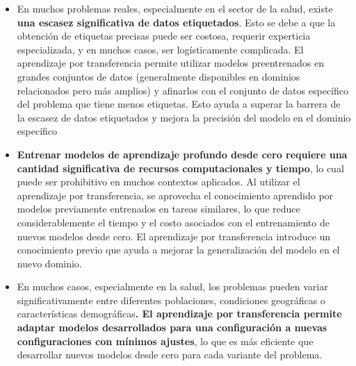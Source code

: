 \documentclass{article}
\begin{document}
\begin{enumerate}
\begin{enumerate}
\begin{itemize}
    \item En muchos problemas reales, especialmente en el sector de la salud, existe \textbf{una escasez significativa de datos etiquetados}. Esto se debe a que la obtención de etiquetas precisas puede ser costosa, requerir experticia especializada, y en muchos casos, ser logísticamente complicada. El aprendizaje por transferencia permite utilizar modelos preentrenados en grandes conjuntos de datos (generalmente disponibles en dominios relacionados pero más amplios) y afinarlos con el conjunto de datos específico del problema que tiene menos etiquetas. Esto ayuda a superar la barrera de la escasez de datos etiquetados y mejora la precisión del modelo en el dominio específico
    \item \textbf{Entrenar modelos de aprendizaje profundo desde cero requiere una cantidad significativa de recursos computacionales y tiempo}, lo cual puede ser prohibitivo en muchos contextos aplicados. Al utilizar el aprendizaje por transferencia, se aprovecha el conocimiento aprendido por modelos previamente entrenados en tareas similares, lo que reduce considerablemente el tiempo y el costo asociados con el entrenamiento de nuevos modelos desde cero.  El aprendizaje por transferencia introduce un conocimiento previo que ayuda a mejorar la generalización del modelo en el nuevo dominio.
     \item  En muchos casos, especialmente en la salud, los problemas pueden variar significativamente entre diferentes poblaciones, condiciones geográficas o características demográficas\textbf{. El aprendizaje por transferencia permite adaptar modelos desarrollados para una configuración a nuevas configuraciones con mínimos ajustes}, lo que es más eficiente que desarrollar nuevos modelos desde cero para cada variante del problema.
    
\end{itemize}

\end{enumerate}
\end{enumerate}
\end{document}
